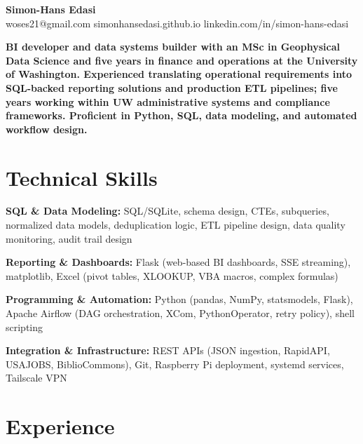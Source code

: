 \documentclass[11pt,a4paper]{article}
\begin{document}
\noindent{}

\begin{center}
    {\LARGE \textbf{Simon-Hans Edasi}} \\[6pt]
    woses21@gmail.com \hfill \textbar \hfill
    simonhansedasi.github.io \hfill \textbar \hfill
    linkedin.com/in/simon-hans-edasi
\end{center}

\vspace{0.3cm}

\noindent
\textbf{BI developer and data systems builder with an MSc in Geophysical Data Science and five years in finance and operations at the University of Washington. Experienced translating operational requirements into SQL-backed reporting solutions and production ETL pipelines; five years working within UW administrative systems and compliance frameworks. Proficient in Python, SQL, data modeling, and automated workflow design.}

\section*{Technical Skills}

\noindent
\textbf{SQL \& Data Modeling:} SQL/SQLite, schema design, CTEs, subqueries, normalized data models, deduplication logic, ETL pipeline design, data quality monitoring, audit trail design

\noindent
\textbf{Reporting \& Dashboards:} Flask (web-based BI dashboards, SSE streaming), matplotlib, Excel (pivot tables, XLOOKUP, VBA macros, complex formulas)

\noindent
\textbf{Programming \& Automation:} Python (pandas, NumPy, statsmodels, Flask), Apache Airflow (DAG orchestration, XCom, PythonOperator, retry policy), shell scripting

\noindent
\textbf{Integration \& Infrastructure:} REST APIs (JSON ingestion, RapidAPI, USAJOBS, BiblioCommons), Git, Raspberry Pi deployment, systemd services, Tailscale VPN

\section*{Experience}
\end{document}

